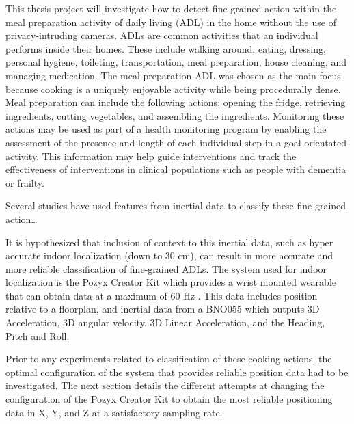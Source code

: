 This thesis project will investigate how to detect fine-grained action within the meal preparation activity of daily living 
(ADL) in the home without the use of privacy-intruding cameras. ADLs are common activities that an individual 
performs inside their homes. These include walking around, eating, dressing, personal hygiene, toileting, 
transportation, meal preparation, house cleaning, and managing medication. The meal preparation ADL was chosen as the 
main focus because cooking is a uniquely enjoyable activity while being procedurally dense. Meal preparation can include 
the following actions: opening the fridge, retrieving ingredients, cutting vegetables, and assembling the ingredients. 
Monitoring these actions may be used as part of a health monitoring program by enabling the assessment of the presence and 
length of each individual step in a goal-orientated activity. This information may help guide interventions and track 
the effectiveness of interventions in clinical populations such as people with dementia or frailty. 

Several studies have used features from inertial data to classify these fine-grained action…

It is hypothesized that inclusion of context to this inertial data, such as hyper accurate 
indoor localization (down to 30 cm), can result in more accurate and more reliable 
classification of fine-grained ADLs. 
The system used for indoor localization is the Pozyx Creator Kit which provides a wrist mounted 
wearable that can obtain data at a maximum of 60 Hz \cite{noauthor_creator_nodate}. This data includes position relative to a 
floorplan, and inertial data from a BNO055 which outputs 3D Acceleration, 3D angular velocity, 
3D Linear Acceleration, and the Heading, Pitch and Roll.

Prior to any experiments related to classification of these cooking actions, the optimal 
configuration of the system that provides reliable position data had to be investigated. 
The next section details the different attempts at changing the configuration of the Pozyx 
Creator Kit to obtain the most reliable positioning data in X, Y, and Z at a satisfactory 
sampling rate. 
